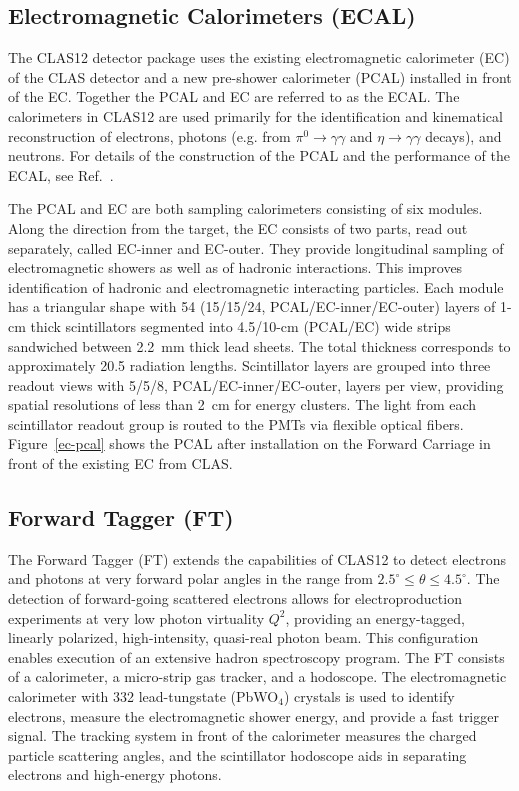 \documentclass[final,3p,twocolumn]{elsarticle}
\begin{document}
\subsection{Electromagnetic Calorimeters (ECAL)}

The CLAS12 detector package uses the existing electromagnetic calorimeter (EC) of the CLAS detector
\cite{Amarian:2001zs} and a new pre-shower calorimeter (PCAL) installed in front of the EC. Together the
PCAL and EC are referred to as the ECAL. The calorimeters in CLAS12 are used primarily for the identification
and kinematical reconstruction of electrons, photons (e.g. from $\pi^0 \to \gamma \gamma$ and
$\eta \to \gamma  \gamma$ decays), and neutrons. For details of the construction of the PCAL and the
performance of the ECAL, see Ref.~\cite{ECAL}. 

The PCAL and EC are both sampling calorimeters consisting of six modules. Along the direction from the target,
the EC consists of two parts, read out separately, called EC-inner and EC-outer. They provide longitudinal sampling
of electromagnetic showers as well as of hadronic interactions. This improves identification of hadronic and
electromagnetic interacting particles. Each module has a triangular shape with 54 (15/15/24, PCAL/EC-inner/EC-outer)
layers of 1-cm thick scintillators segmented into 4.5/10-cm (PCAL/EC) wide strips sandwiched between 2.2~mm thick
lead sheets. The total thickness corresponds to approximately 20.5 radiation lengths. Scintillator layers are grouped
into three readout views with 5/5/8, PCAL/EC-inner/EC-outer, layers per view, providing spatial resolutions of less
than 2~cm for energy clusters. The light from each scintillator readout group is routed to the PMTs via flexible
optical fibers. Figure~\ref{ec-pcal} shows the PCAL after installation on the Forward Carriage in front of the
existing EC from CLAS.

\subsection{Forward Tagger (FT)}

The Forward Tagger (FT) extends the capabilities of CLAS12 to detect electrons and photons at very forward
polar angles in the range from $2.5^\circ \le \theta \le 4.5^\circ$. The detection of forward-going scattered
electrons allows for electroproduction experiments at very low photon virtuality $Q^2$, providing an
energy-tagged, linearly polarized, high-intensity, quasi-real photon beam. This configuration enables execution of
an extensive hadron spectroscopy program. The FT consists of a calorimeter, a micro-strip gas tracker, and a
hodoscope. The electromagnetic calorimeter with 332 lead-tungstate (PbWO$_4$) crystals is used to identify
electrons,  measure the electromagnetic shower energy, and provide a fast trigger signal. The tracking system in
front of the calorimeter measures the charged particle scattering angles, and the scintillator hodoscope aids in
separating electrons and high-energy photons.
\end{document}
